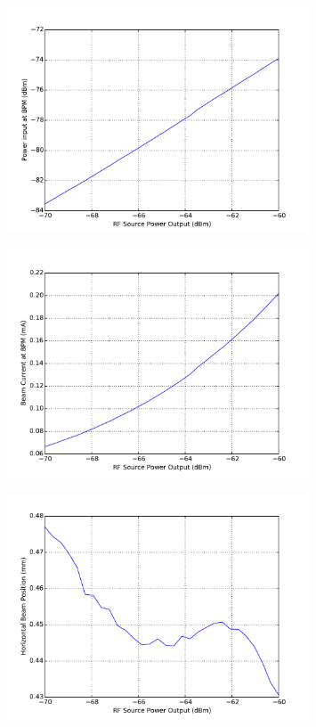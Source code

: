 \documentclass[a4paper, 11pt]{article}%
\begin{document}
\begin{figure}[htbp]%
\centering%
\includegraphics[width=0.8\textwidth]{./Results/power_vs_power.pdf}%
\caption{}%
\end{figure}

%


\begin{figure}[htbp]%
\centering%
\includegraphics[width=0.8\textwidth]{./Results/power_vs_current.pdf}%
\caption{}%
\end{figure}

%


\begin{figure}[htbp]%
\centering%
\includegraphics[width=0.8\textwidth]{./Results/power_vs_X.pdf}%
\caption{}%
\end{figure}
\end{document}
